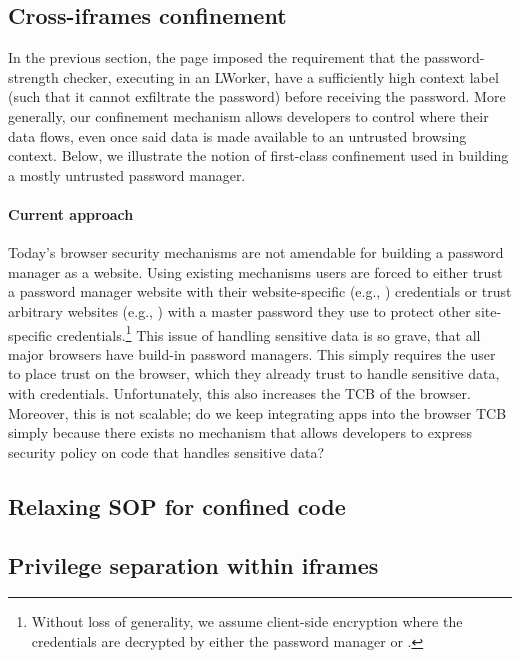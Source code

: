\subsection{Cross-iframes confinement}
\label{sec:system:iframe}

In the previous section, the  page imposed the
requirement that the password-strength checker, executing in an
LWorker, have a sufficiently high context label (such that it cannot
exfiltrate the password) before receiving the password.
%
More generally, our confinement mechanism allows developers to control
where their data flows, even once said data is made available to an
untrusted browsing context.
%
Below, we illustrate the notion of first-class confinement used
in building a mostly untrusted password manager.

\paragraph{Current approach}
%
Today's browser security mechanisms are not amendable for building a
password manager as a website.
%
Using existing mechanisms users are forced to either trust a password
manager website with their website-specific (e.g., )
credentials or trust arbitrary websites (e.g., ) with a
master password they use to protect other site-specific
credentials.\footnote{
  Without loss of generality, we assume client-side encryption where
  the credentials are decrypted by either the password manager or
  .
}
%
This issue of handling sensitive data is so grave, that all major
browsers have build-in password managers.
%
This simply requires the user to place trust on the browser, which
they already trust to handle sensitive data, with credentials.
%
Unfortunately, this also increases the TCB of the browser.
%
Moreover, this is not scalable; do we keep integrating apps into the
browser TCB simply because there exists no mechanism that allows
developers to express security policy on code that handles sensitive
data?





\subsection{Relaxing SOP for confined code}
\label{sec:system:mashup}

\subsection{Privilege separation within iframes}
\label{sec:system:script}

